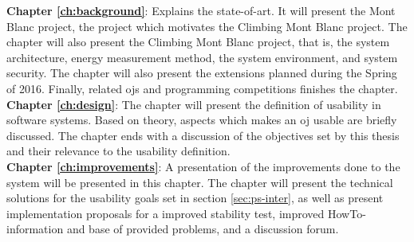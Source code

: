 \textbf{Chapter \ref{ch:background}}: Explains the state-of-art. It will present the Mont Blanc project, the project which motivates the Climbing Mont Blanc project. The chapter will also present the Climbing Mont Blanc project, that is, the system architecture, energy measurement method, the system environment, and system security. The chapter will also present the extensions planned during the Spring of 2016. Finally, related \glspl{oj} and programming competitions finishes the chapter. \\

\textbf{Chapter \ref{ch:design}}: The chapter will present the definition of usability in software systems. Based on theory, aspects which makes an \gls{oj} usable are briefly discussed. The chapter ends with a discussion of the objectives set by this thesis and their relevance to the usability definition. \\

\textbf{Chapter \ref{ch:improvements}}: A presentation of the improvements done to the system will be presented in this chapter. The chapter will present the technical solutions for the usability goals set in section \ref{sec:ps-inter}, as well as present implementation proposals for a improved stability test, improved HowTo-information and base of provided problems, and a discussion forum. \\

